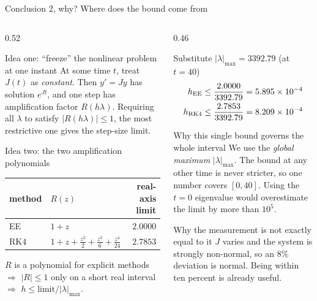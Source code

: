 \documentclass[aspectratio=169,10pt]{beamer}
\begin{document}
\begin{frame}{Conclusion 2, why?  Where does the bound come from}
  \begin{columns}[T]
    \begin{column}{0.52\textwidth}
      \begin{block}{Idea one: ``freeze'' the nonlinear problem at one instant}
        \footnotesize
        At some time $t$, treat $J(t)$ as \emph{constant}.  Then $y'=Jy$ has
        solution $e^{Jt}$, and one step has amplification factor $R(h\lambda)$.
        Requiring \alert{all} $\lambda$ to satisfy $|R(h\lambda)|\le1$, the
        most restrictive one gives the step-size limit.
      \end{block}
      \begin{block}{Idea two: the two amplification polynomials}
        \footnotesize
        \begin{tabular}{@{}llr@{}}
          \toprule
          method & $R(z)$ & real-axis limit \\
          \midrule
          EE  & $1+z$ & $2.0000$ \\
          RK4 & $1+z+\frac{z^2}{2}+\frac{z^3}{6}+\frac{z^4}{24}$ & $2.7853$ \\
          \bottomrule
        \end{tabular}
        \vspace{0.3em}

        $R$ is a polynomial for explicit methods $\Rightarrow$ $|R|\le1$ only
        on a short real interval $\Rightarrow$
        $h\le\text{limit}\big/|\lambda|_{\max}$.
      \end{block}
    \end{column}
    \begin{column}{0.46\textwidth}
      \begin{alertblock}{Substitute $|\lambda|_{\max}=3392.79$ (at $t=40$)}
        \footnotesize
        \begin{align*}
          h_{\rm EE} &\le \frac{2.0000}{3392.79}=5.895\times10^{-4}\\
          h_{\rm RK4}&\le \frac{2.7853}{3392.79}=8.209\times10^{-4}
        \end{align*}
      \end{alertblock}
      \begin{block}{Why this single bound governs the whole interval}
        \footnotesize
        We use the \emph{global maximum} $|\lambda|_{\max}$.  The bound at any
        other time is never stricter, so one number covers $[0,40]$.
        Using the $t=0$ eigenvalue would overestimate the limit by more than
        $10^5$.
      \end{block}
      \begin{block}{Why the measurement is not exactly equal to it}
        \footnotesize
        $J$ varies and the system is strongly non-normal, so an $8\%$
        deviation is normal.  \alert{Being within ten percent is already
        useful.}
      \end{block}
    \end{column}
  \end{columns}
\end{frame}
\end{document}
